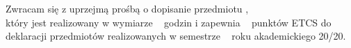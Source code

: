 \documentclass{wmiisubmission}
\begin{document}
\cracowdate
{}
\studentaddress
\addressee{\piotrniemiec}

\vskip 3.0cm


\vskip 0.5cm

Zwracam się z uprzejmą prośbą o dopisanie przedmiotu \dotfill, \\
który jest realizowany w wymiarze \fillField{1.2cm}~ godzin i zapewnia
\fillField{1.2cm}~
punktów ETCS do deklaracji przedmiotów realizowanych w semestrze \dotfill~
roku akademickiego 20\fillField{0.7cm}/20\fillField{0.7cm}.

\vskip 2.0cm

\studentsignature

\vfill

\end{document}
